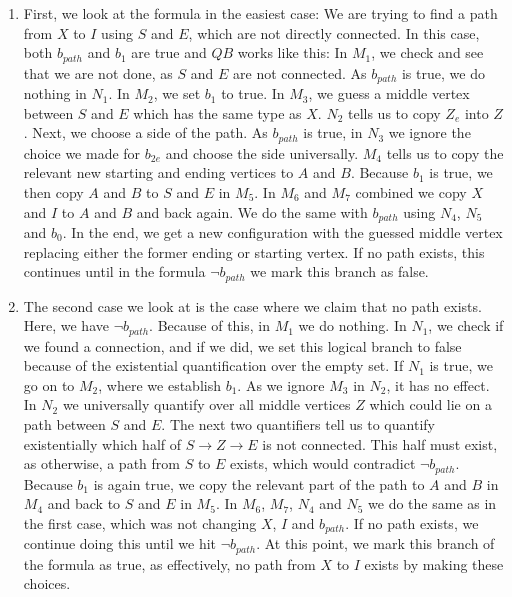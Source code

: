 \begin{enumerate}
    \item First, we look at the formula in the easiest case: We are trying to find a path from $X$ to $I$ using $S$ and $E$, which are not directly connected.
    In this case, both $b_{path}$ and $b_1$ are true and $QB$ works like this:
    In $M_1$, we check and see that we are not done, as $S$ and $E$ are not connected.
    As $b_{path}$ is true, we do nothing in $N_1$.
    In $M_2$, we set $b_1$ to true.
    In $M_3$, we guess a middle vertex between $S$ and $E$ which has the same type as $X$. %
    $N_2$ tells us to copy $Z_e$ into $Z$.
    Next, we choose a side of the path.
    As $b_{path}$ is true, in $N_3$ we ignore the choice we made for $b_{2e}$ and choose the side universally.
    $M_4$ tells us to copy the relevant new starting and ending vertices to $A$ and $B$.
    Because $b_1$ is true, we then copy $A$ and $B$ to $S$ and $E$ in $M_5$.
    In $M_6$ and $M_7$ combined we copy $X$ and $I$ to $A$ and $B$ and back again.
    We do the same with $b_{path}$ using $N_4$, $N_5$ and $b_0$.
    In the end, we get a new configuration with the guessed middle vertex replacing either the former ending or starting vertex.
    If no path exists, this continues until in the formula $\neg b_{path}$ we mark this branch as false.

    \item The second case we look at is the case where we claim that no path exists.
    Here, we have $\neg b_{path}$.
    Because of this, in $M_1$ we do nothing.
    In $N_1$, we check if we found a connection, and if we did, we set this logical branch to false because of the existential quantification over the empty set.
    If $N_1$ is true, we go on to $M_2$, where we establish $b_1$.
    As we ignore $M_3$ in $N_2$, it has no effect.
    In $N_2$ we universally quantify over all middle vertices $Z$ which could lie on a path between $S$ and $E$.
    The next two quantifiers tell us to quantify existentially which half of $S \to Z \to E$ is not connected.
    This half must exist, as otherwise, a path from $S$ to $E$ exists, which would contradict $\neg b_{path}$.
    Because $b_1$ is again true, we copy the relevant part of the path to $A$ and $B$ in $M_4$ and back to $S$ and $E$ in $M_5$.
    In $M_6$, $M_7$, $N_4$ and $N_5$ we do the same as in the first case, which was not changing $X$, $I$ and $b_{path}$.
    If no path exists, we continue doing this until we hit $\neg b_{path}$.
    At this point, we mark this branch of the formula as true, as effectively, no path from $X$ to $I$ exists by making these choices.


\end{enumerate}
